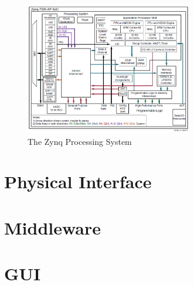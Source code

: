 \begin{figure}[H]
\centering
\includegraphics[width=0.65\textwidth]{figures/Zynq.png}
\caption{The Zynq Processing System~\cite{book:ZynqBook}}
\label{fig:Zynq}
\end{figure}

\section{Physical Interface}
\section{Middleware}
\section{GUI}